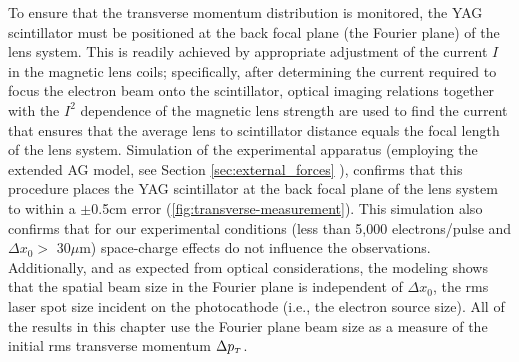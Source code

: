 To ensure that the transverse momentum distribution is monitored, the YAG scintillator must be positioned at the back focal plane (the Fourier plane) of the lens system.
This is readily achieved by appropriate adjustment of the current $I$ in the magnetic lens coils; specifically, after determining the current required to focus the electron beam onto the scintillator, optical imaging relations together with the $I^2$ dependence of the magnetic lens strength are used to find the current that ensures that the average lens to scintillator distance equals the focal length of the lens system.
Simulation of the experimental apparatus (employing the extended AG model, see Section \ref{sec:external_forces} ), confirms that this procedure places the YAG scintillator at the back focal plane of the lens system to within a $\pm$0.5cm error (\ref{fig:transverse-measurement}).
This simulation also confirms that for our experimental conditions (less than 5,000 electrons/pulse and $\Delta x_0 > $ 30$\mu$m) space-charge effects do not influence the observations.
Additionally, and as expected from optical considerations, the modeling shows that the spatial beam size in the Fourier plane is independent of $\Delta x_0$, the rms laser spot size incident on the photocathode (i.e., the electron source size).
All of the results in this chapter use the Fourier plane beam size as a measure of the initial rms transverse momentum $\Delta p_{{\scriptscriptstyle T}}$.

